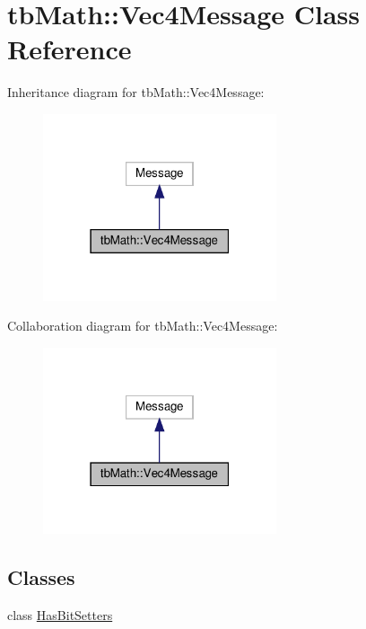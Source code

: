 \hypertarget{classtbMath_1_1Vec4Message}{}\section{tb\+Math\+:\+:Vec4\+Message Class Reference}
\label{classtbMath_1_1Vec4Message}


Inheritance diagram for tb\+Math\+:\+:Vec4\+Message\+:
\nopagebreak
\begin{figure}[H]
\begin{center}
\leavevmode
\includegraphics[width=195pt]{classtbMath_1_1Vec4Message__inherit__graph}
\end{center}
\end{figure}


Collaboration diagram for tb\+Math\+:\+:Vec4\+Message\+:
\nopagebreak
\begin{figure}[H]
\begin{center}
\leavevmode
\includegraphics[width=195pt]{classtbMath_1_1Vec4Message__coll__graph}
\end{center}
\end{figure}
\subsection*{Classes}
\begin{DoxyCompactItemize}
\item 
class \hyperlink{classtbMath_1_1Vec4Message_1_1HasBitSetters}{Has\+Bit\+Setters}
\end{DoxyCompactItemize}
